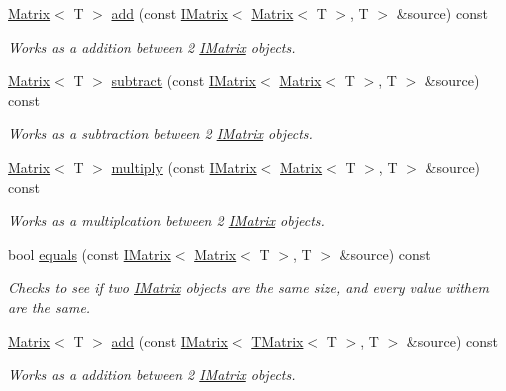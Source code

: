 \begin{DoxyCompactItemize}
\mbox{\hyperlink{class_matrix}{Matrix}}$<$ T $>$ \mbox{\hyperlink{class_u_matrix_a646d97c9891d10bfde81ac90ea002811}{add}} (const \mbox{\hyperlink{class_i_matrix}{I\+Matrix}}$<$ \mbox{\hyperlink{class_matrix}{Matrix}}$<$ T $>$, T $>$ \&source) const
\begin{DoxyCompactList}\small\item\em Works as a addition between 2 \mbox{\hyperlink{class_i_matrix}{I\+Matrix}} objects. \end{DoxyCompactList}\item 
\mbox{\hyperlink{class_matrix}{Matrix}}$<$ T $>$ \mbox{\hyperlink{class_u_matrix_afde9d8093462f7e07f856c6f7c5106b1}{subtract}} (const \mbox{\hyperlink{class_i_matrix}{I\+Matrix}}$<$ \mbox{\hyperlink{class_matrix}{Matrix}}$<$ T $>$, T $>$ \&source) const
\begin{DoxyCompactList}\small\item\em Works as a subtraction between 2 \mbox{\hyperlink{class_i_matrix}{I\+Matrix}} objects. \end{DoxyCompactList}\item 
\mbox{\hyperlink{class_matrix}{Matrix}}$<$ T $>$ \mbox{\hyperlink{class_u_matrix_ae9b6d52219a08ded85587635414ca7f2}{multiply}} (const \mbox{\hyperlink{class_i_matrix}{I\+Matrix}}$<$ \mbox{\hyperlink{class_matrix}{Matrix}}$<$ T $>$, T $>$ \&source) const
\begin{DoxyCompactList}\small\item\em Works as a multiplcation between 2 \mbox{\hyperlink{class_i_matrix}{I\+Matrix}} objects. \end{DoxyCompactList}\item 
bool \mbox{\hyperlink{class_u_matrix_aed1576427a21090fe55e9993e7f2f72f}{equals}} (const \mbox{\hyperlink{class_i_matrix}{I\+Matrix}}$<$ \mbox{\hyperlink{class_matrix}{Matrix}}$<$ T $>$, T $>$ \&source) const
\begin{DoxyCompactList}\small\item\em Checks to see if two \mbox{\hyperlink{class_i_matrix}{I\+Matrix}} objects are the same size, and every value withem are the same. \end{DoxyCompactList}\item 
\mbox{\hyperlink{class_matrix}{Matrix}}$<$ T $>$ \mbox{\hyperlink{class_u_matrix_ae897e1e22424ea7eea1c19ac3b9034de}{add}} (const \mbox{\hyperlink{class_i_matrix}{I\+Matrix}}$<$ \mbox{\hyperlink{class_t_matrix}{T\+Matrix}}$<$ T $>$, T $>$ \&source) const
\begin{DoxyCompactList}\small\item\em Works as a addition between 2 \mbox{\hyperlink{class_i_matrix}{I\+Matrix}} objects. \end{DoxyCompactList}\item 

\end{DoxyCompactItemize}
